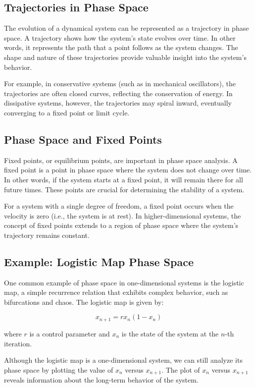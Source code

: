 \documentclass{amsbook}
\begin{document}
\subsection{Trajectories in Phase Space}

The evolution of a dynamical system can be represented as a trajectory in phase space. A trajectory shows how the system's state evolves over time. In other words, it represents the path that a point follows as the system changes. The shape and nature of these trajectories provide valuable insight into the system's behavior.

For example, in conservative systems (such as in mechanical oscillators), the trajectories are often closed curves, reflecting the conservation of energy. In dissipative systems, however, the trajectories may spiral inward, eventually converging to a fixed point or limit cycle.

\subsection{Phase Space and Fixed Points}

Fixed points, or equilibrium points, are important in phase space analysis. A fixed point is a point in phase space where the system does not change over time. In other words, if the system starts at a fixed point, it will remain there for all future times. These points are crucial for determining the stability of a system.

For a system with a single degree of freedom, a fixed point occurs when the velocity is zero (i.e., the system is at rest). In higher-dimensional systems, the concept of fixed points extends to a region of phase space where the system's trajectory remains constant.

\subsection{Example: Logistic Map Phase Space}

One common example of phase space in one-dimensional systems is the logistic map, a simple recurrence relation that exhibits complex behavior, such as bifurcations and chaos. The logistic map is given by:

\[
x_{n+1} = r x_n (1 - x_n)
\]

where \( r \) is a control parameter and \( x_n \) is the state of the system at the \( n \)-th iteration.

Although the logistic map is a one-dimensional system, we can still analyze its phase space by plotting the value of \( x_n \) versus \( x_{n+1} \). The plot of \( x_n \) versus \( x_{n+1} \) reveals information about the long-term behavior of the system.
\end{document}

